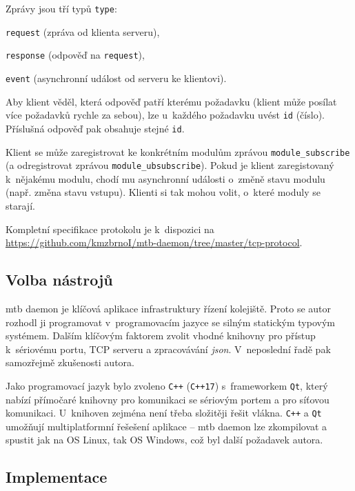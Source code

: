 Zprávy jsou tří typů \texttt{type}:

\begin{compactenum}
\item \texttt{request} (zpráva od klienta serveru),
\item \texttt{response} (odpověď na \texttt{request}),
\item \texttt{event} (asynchronní událost od serveru ke klientovi).
\end{compactenum}

Aby klient věděl, která odpověď patří kterému požadavku (klient může posílat
více požadavků rychle za sebou), lze u~každého požadavku uvést \texttt{id}
(číslo). Příslušná odpověď pak obsahuje stejné \texttt{id}.

Klient se může zaregistrovat ke konkrétním modulům zprávou
\texttt{module\_subscribe} (a odregistrovat zprávou
\texttt{module\_ubsubscribe}). Pokud je klient zaregistovaný k~nějakému modulu,
chodí mu asynchronní události o~změně stavu modulu (např. změna stavu vstupu).
Klienti si tak mohou volit, o~které moduly se starají.

Kompletní specifikace protokolu je k~dispozici na
\url{https://github.com/kmzbrnoI/mtb-daemon/tree/master/tcp-protocol}.

\subsection{Volba nástrojů} \label{sec:daemon:tools}

\gls{mtb} daemon je klíčová aplikace infrastruktury řízení kolejiště. Proto se
autor rozhodl ji programovat v~programovacím jazyce se silným statickým typovým
systémem. Dalším klíčovým faktorem zvolit vhodné knihovny pro přístup
k~sériovému portu, TCP serveru a zpracovávání \textit{json}. V~neposlední řadě
pak samozřejmě zkušenosti autora.

Jako programovací jazyk bylo zvoleno \texttt{C++} (\texttt{C++17})
s~frameworkem \texttt{Qt}, který nabízí přímočaré knihovny pro komunikaci se
sériovým portem a pro síťovou komunikaci. U~knihoven zejména není třeba
složitěji řešit vlákna. \texttt{C++} a \texttt{Qt} umožňují multiplatformní
řešešení aplikace – \gls{mtb} daemon lze zkompilovat a spustit jak na OS Linux,
tak OS Windows, což byl další požadavek autora.

\subsection{Implementace} \label{sec:daemon:impl}

